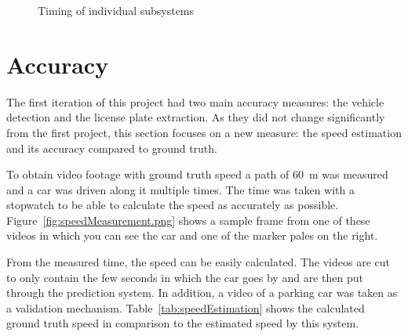 \begin{figure}
    \centering
    \caption{Timing of individual subsystems}
    \label{fig:timing}
\end{figure}



\section{Accuracy}

The first iteration of this project had two main accuracy measures: the vehicle detection and the license plate extraction.
As they did not change significantly from the first project, this section focuses on a new measure: the speed estimation and its accuracy compared to ground truth.

To obtain video footage with ground truth speed a path of \SI{60}{\metre} was measured and a car was driven along it multiple times.
The time was taken with a stopwatch to be able to calculate the speed as accurately as possible.
Figure~\ref{fig:speedMeasurement.png} shows a sample frame from one of these videos in which you can see the car and one of the marker pales on the right.


From the measured time, the speed can be easily calculated.
The videos are cut to only contain the few seconds in which the car goes by and are then put through the prediction system.
In addition, a video of a parking car was taken as a validation mechanism.
Table~\ref{tab:speedEstimation} shows the calculated ground truth speed in comparison to the estimated speed by this system.

